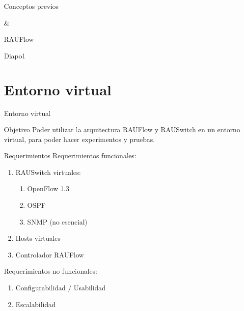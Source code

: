 \documentclass[xcolor=svgnames]{beamer}
\begin{document}
\begin{frame}{}
	\begin{center}
		\huge{Conceptos previos}
	\end{center}
	\begin{center}
		\huge{\&}
	\end{center}
	\begin{center}
		\huge{RAUFlow}
	\end{center}
\end{frame}

\begin{frame}{Diapo1}
	
\end{frame}





\section{Entorno virtual}

\begin{frame}{}
	\begin{center}
		\huge{Entorno virtual}
	\end{center}
\end{frame}

\begin{frame}{Objetivo}
	Poder utilizar la arquitectura RAUFlow y RAUSwitch en un entorno virtual, para poder hacer experimentos y pruebas.
\end{frame}

\begin{frame}{Requerimientos}
	Requerimientos funcionales:
	\begin{enumerate}
		\item RAUSwitch virtuales:
		\begin{enumerate}
			\item OpenFlow 1.3
			\item OSPF
			\item SNMP (no esencial)
		\end{enumerate}
		\item Hosts virtuales
		\item Controlador RAUFlow
	\end{enumerate}
	\pause
	Requerimientos no funcionales:
	\begin{enumerate}
		\item Configurabilidad / Usabilidad
		\item Escalabilidad
	\end{enumerate}
\end{frame}
\end{document}
